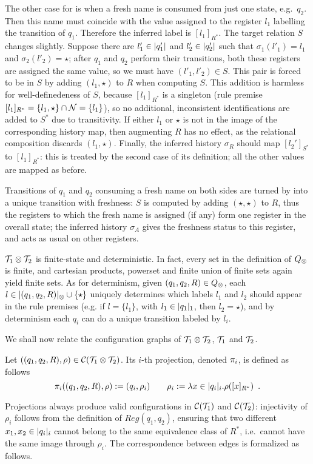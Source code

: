 The other case for \regrule{} is when a fresh name is consumed from just one state, e.g.\ $q_2$. Then %
this name must coincide with the value assigned to the register $l_1$ labelling the transition of $q_1$. Therefore the inferred label is $[l_1]_{R^*}$. The target relation $S$ changes slightly. Suppose there are $l'_1 \in |q'_1|$ and $l'_2\in |q'_2|$ such that $\sigma_1(l'_1) = l_1$ and $\sigma_2(l'_2) = \star$; after $q_1$ and $q_2$ perform their transitions, both these registers are assigned the same value, so we must have $(l'_1,l'_2) \in S$. This pair is forced to be in $S$ by adding $(l_1,\star)$ to $R$ when computing $S$. This addition is harmless for well-definedeness of $S$, because $[l_1]_{R^*}$ is a singleton (rule premise $[l_1]_{R^*} = \{l_1,\star\} \cap 	\mathcal{N} = \{l_1\}$), so no additional, inconsistent identifications are added to $S^*$ due to transitivity. If either $l_1$ or $\star$ is not in the image of the corresponding history map, then augmenting $R$ has no effect, as the relational composition discards $(l_1,\star)$. Finally, the inferred history $\sigma_R$ should map $[l_2']_{S^*}$ to $[l_1]_{R^*}$: this is treated by the second case of its definition; all the other values are mapped as before.

Transitions of $q_1$ and $q_2$ consuming a fresh name on both sides are turned by \allrule{} into a unique transition with freshness: $S$ is computed by adding $(\star,\star)$ to $R$, thus the registers to which the fresh name is assigned (if any) form one register in the overall state; the inferred history $\sigma_A$ gives the freshness status to this register, and acts as usual on other registers.

\begin{remark}
\label{rem:syncp-fin-det}
$\mathcal{T}_1 \otimes \mathcal{T}_2$ is finite-state and deterministic. In fact, every set in the definition of $Q_{\otimes}$ is finite, and cartesian products, powerset and finite union of finite sets again yield finite sets. As for determinism, given $(q_1,q_2,R) \in Q_{\otimes}$, each $l \in |(q_1,q_2,R)|_{\otimes} \cup \{\star\}$ uniquely determines which labels $l_1$ and $l_2$ should appear in the rule premises (e.g. if $l = \{l_1\}$, with $l_1 \in |q_1|_1$, then $l_2 = \star$), and by determinism each $q_i$ can do a unique transition labeled by $l_i$.
\end{remark}
%
We shall now relate the configuration graphs of $\mathcal{T}_1 \otimes \mathcal{T}_2$, $\mathcal{T}_1$ and $\mathcal{T}_2$.
%
\begin{definition}
Let $((q_1,q_2,R),\rho) \in \mathcal{C}(\mathcal{T}_1 \otimes \mathcal{T}_2)$. Its $i$-th projection, denoted $\pi_i$, is defined as follows
\[
	\pi_i((q_1,q_2,R),\rho) := (q_i,\rho_i) \qquad \rho_i := \lambda x \in |q_i|_i.\rho([x]_{R^*}) \enspace .
\]
\end{definition}
%
Projections always produce valid configurations in $\mathcal{C}(\mathcal{T}_1)$ and $\mathcal{C}(\mathcal{T}_2)$: injectivity of $\rho_i$ follows from the definition of $Reg(q_1,q_2)$, ensuring that two different $x_1,x_2 \in |q_i|_i$ cannot belong to the same equivalence class of $R^*$, i.e.\ cannot have the same image through $\rho_i$. The correspondence between edges is formalized as follows.

